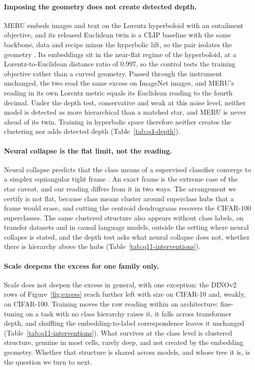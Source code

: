 \documentclass{article}
\theoremstyle{definition}
\begin{document}
\paragraph{Imposing the geometry does not create detected depth.} MERU embeds images and text on the Lorentz hyperboloid with an entailment objective, and its released Euclidean twin is a CLIP baseline with the same backbone, data and recipe minus the hyperbolic lift, so the pair isolates the geometry \citep{desai2023meru}. Its embeddings sit in the near-flat regime of the hyperboloid, at a Lorentz-to-Euclidean distance ratio of $0.997$, so the control tests the training objective rather than a curved geometry. Passed through the instrument unchanged, the two read the same excess on ImageNet images, and MERU's reading in its own Lorentz metric equals its Euclidean reading to the fourth decimal. Under the depth test, conservative and weak at this noise level, neither model is detected as more hierarchical than a matched star, and MERU is never ahead of its twin. Training in hyperbolic space therefore neither creates the clustering nor adds detected depth (Table~\ref{tab:q4-depth}). %

\paragraph{Neural collapse is the flat limit, not the reading.} Neural collapse predicts that the class means of a supervised classifier converge to a simplex equiangular tight frame \citep{papyan2020prevalence}. An exact frame is the extreme case of the star caveat, and our reading differs from it in two ways. The arrangement we certify is not flat, because class means cluster around superclass hubs that a frame would erase, and cutting the centroid dendrograms recovers the CIFAR-100 superclasses. The same clustered structure also appears without class labels, on transfer datasets and in causal language models, outside the setting where neural collapse is stated, and the depth test asks what neural collapse does not, whether there is hierarchy above the hubs (Table~\ref{tab:q11-interventions}). %

\paragraph{Scale deepens the excess for one family only.} Scale does not deepen the excess in general, with one exception: the DINOv2 rows of Figure~\ref{fig:excess} reach further left with size on CIFAR-10 and, weakly, on CIFAR-100. Training moves the raw reading within an architecture: fine-tuning on a task with no class hierarchy raises it, it falls across transformer depth, and shuffling the embedding-to-label correspondence leaves it unchanged (Table~\ref{tab:q11-interventions}). What survives at the class level is clustered structure, genuine in most cells, rarely deep, and not created by the embedding geometry. Whether that structure is shared across models, and whose tree it is, is the question we turn to next. %
\end{document}
